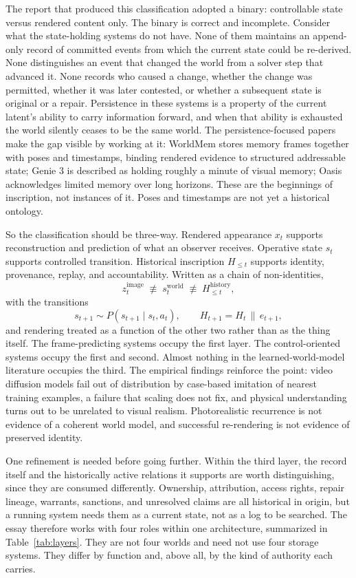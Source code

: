 \documentclass[11pt]{article}
\begin{document}
The report that produced this classification adopted a binary: controllable state versus rendered content only. The binary is correct and incomplete. Consider what the state-holding systems do not have. None of them maintains an append-only record of committed events from which the current state could be re-derived. None distinguishes an event that changed the world from a solver step that advanced it. None records who caused a change, whether the change was permitted, whether it was later contested, or whether a subsequent state is original or a repair. Persistence in these systems is a property of the current latent's ability to carry information forward, and when that ability is exhausted the world silently ceases to be the same world. The persistence-focused papers make the gap visible by working at it: WorldMem stores memory frames together with poses and timestamps, binding rendered evidence to structured addressable state; Genie 3 is described as holding roughly a minute of visual memory; Oasis acknowledges limited memory over long horizons. These are the beginnings of inscription, not instances of it. Poses and timestamps are not yet a historical ontology.

So the classification should be three-way. Rendered appearance $x_t$ supports reconstruction and prediction of what an observer receives. Operative state $s_t$ supports controlled transition. Historical inscription $H_{\leq t}$ supports identity, provenance, replay, and accountability. Written as a chain of non-identities,
\[
z_t^{\mathrm{image}} \;\not\equiv\; s_t^{\mathrm{world}} \;\not\equiv\; H_{\leq t}^{\mathrm{history}},
\]
with the transitions
\[
s_{t+1} \sim P(s_{t+1} \mid s_t, a_t), \qquad H_{t+1} = H_t \,\|\, e_{t+1},
\]
and rendering treated as a function of the other two rather than as the thing itself. The frame-predicting systems occupy the first layer. The control-oriented systems occupy the first and second. Almost nothing in the learned-world-model literature occupies the third. The empirical findings reinforce the point: video diffusion models fail out of distribution by case-based imitation of nearest training examples, a failure that scaling does not fix, and physical understanding turns out to be unrelated to visual realism. Photorealistic recurrence is not evidence of a coherent world model, and successful re-rendering is not evidence of preserved identity.

One refinement is needed before going further. Within the third layer, the record itself and the historically active relations it supports are worth distinguishing, since they are consumed differently. Ownership, attribution, access rights, repair lineage, warrants, sanctions, and unresolved claims are all historical in origin, but a running system needs them as a current state, not as a log to be searched. The essay therefore works with four roles within one architecture, summarized in Table~\ref{tab:layers}. They are not four worlds and need not use four storage systems. They differ by function and, above all, by the kind of authority each carries.
\end{document}
